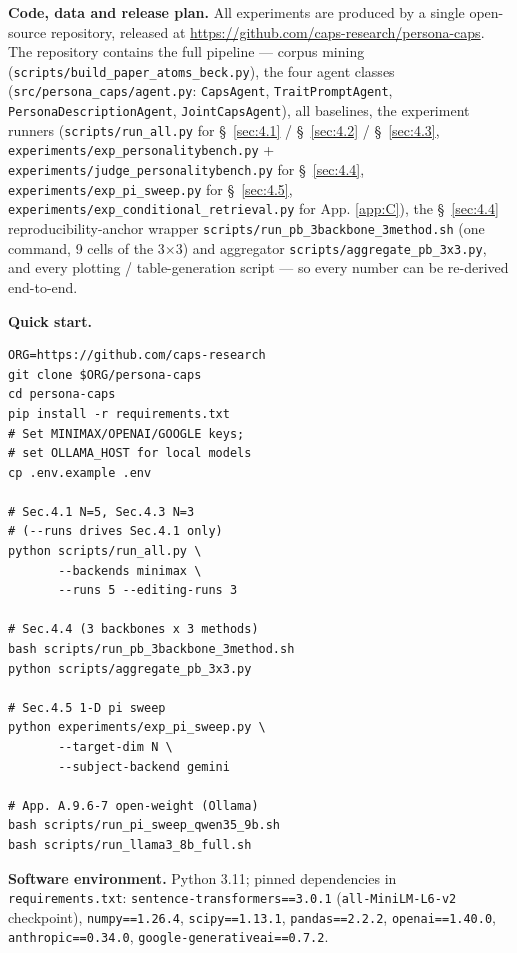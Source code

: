 \textbf{Code, data and release plan.} All experiments are produced by a single open-source repository, released at \url{https://github.com/caps-research/persona-caps}. The repository contains the full pipeline --- corpus mining (\texttt{scripts/\allowbreak{}build\_\allowbreak{}paper\_\allowbreak{}atoms\_\allowbreak{}beck.py}), the four agent classes (\texttt{src/\allowbreak{}persona\_\allowbreak{}caps/\allowbreak{}agent.py}: \texttt{CapsAgent}, \texttt{TraitPromptAgent}, \texttt{PersonaDescriptionAgent}, \texttt{JointCapsAgent}), all baselines, the experiment runners (\texttt{scripts/\allowbreak{}run\_\allowbreak{}all.py} for \S~\ref{sec:4.1} / \S~\ref{sec:4.2} / \S~\ref{sec:4.3}, \texttt{experiments/\allowbreak{}exp\_\allowbreak{}personalitybench.py} + \texttt{experiments/\allowbreak{}judge\_\allowbreak{}personalitybench.py} for \S~\ref{sec:4.4}, \texttt{experiments/\allowbreak{}exp\_\allowbreak{}pi\_\allowbreak{}sweep.py} for \S~\ref{sec:4.5}, \texttt{experiments/\allowbreak{}exp\_\allowbreak{}conditional\_\allowbreak{}retrieval.py} for App. \ref{app:C}), the \S~\ref{sec:4.4} reproducibility-anchor wrapper \texttt{scripts/\allowbreak{}run\_\allowbreak{}pb\_\allowbreak{}3backbone\_\allowbreak{}3method.sh} (one command, 9 cells of the 3$\times$3) and aggregator \texttt{scripts/\allowbreak{}aggregate\_\allowbreak{}pb\_\allowbreak{}3x3.py}, and every plotting / table-generation script --- so every number can be re-derived end-to-end.

\textbf{Quick start.}
\begin{verbatim}
ORG=https://github.com/caps-research
git clone $ORG/persona-caps
cd persona-caps
pip install -r requirements.txt
# Set MINIMAX/OPENAI/GOOGLE keys;
# set OLLAMA_HOST for local models
cp .env.example .env

# Sec.4.1 N=5, Sec.4.3 N=3
# (--runs drives Sec.4.1 only)
python scripts/run_all.py \
       --backends minimax \
       --runs 5 --editing-runs 3

# Sec.4.4 (3 backbones x 3 methods)
bash scripts/run_pb_3backbone_3method.sh
python scripts/aggregate_pb_3x3.py

# Sec.4.5 1-D pi sweep
python experiments/exp_pi_sweep.py \
       --target-dim N \
       --subject-backend gemini

# App. A.9.6-7 open-weight (Ollama)
bash scripts/run_pi_sweep_qwen35_9b.sh
bash scripts/run_llama3_8b_full.sh
\end{verbatim}

\textbf{Software environment.} Python 3.11; pinned dependencies in \texttt{requirements.txt}: \texttt{sentence-\allowbreak{}transformers==\allowbreak{}3.0.1} (\texttt{all-\allowbreak{}MiniLM-\allowbreak{}L6-\allowbreak{}v2} checkpoint), \texttt{numpy==\allowbreak{}1.26.4}, \texttt{scipy==\allowbreak{}1.13.1}, \texttt{pandas==\allowbreak{}2.2.2}, \texttt{openai==\allowbreak{}1.40.0}, \texttt{anthropic==\allowbreak{}0.34.0}, \texttt{google-\allowbreak{}generativeai==\allowbreak{}0.7.2}.

